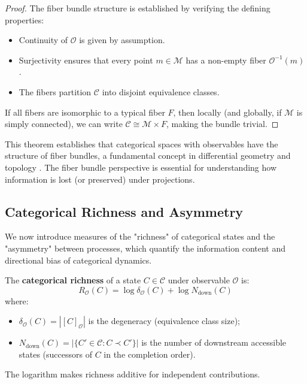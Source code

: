 \begin{proof}
The fiber bundle structure is established by verifying the defining properties:
\begin{itemize}
    \item Continuity of $\mathcal{O}$ is given by assumption.
    \item Surjectivity ensures that every point $m \in \mathcal{M}$ has a non-empty fiber $\mathcal{O}^{-1}(m)$.
    \item The fibers partition $\mathcal{C}$ into disjoint equivalence classes.
\end{itemize}

If all fibers are isomorphic to a typical fiber $F$, then locally (and globally, if $\mathcal{M}$ is simply connected), we can write $\mathcal{C} \cong \mathcal{M} \times F$, making the bundle trivial.
\end{proof}

This theorem establishes that categorical spaces with observables have the structure of fiber bundles, a fundamental concept in differential geometry and topology \citep{steenrod1951topology}. The fiber bundle perspective is essential for understanding how information is lost (or preserved) under projections.

\subsection{Categorical Richness and Asymmetry}

We now introduce measures of the "richness" of categorical states and the "asymmetry" between processes, which quantify the information content and directional bias of categorical dynamics.

\begin{definition}
\label{def:richness_formal}
The \textbf{categorical richness} of a state $C \in \mathcal{C}$ under observable $\mathcal{O}$ is:
\begin{equation}
R_{\mathcal{O}}(C) = \log \delta_{\mathcal{O}}(C) + \log N_{\text{down}}(C)
\label{eq:richness}
\end{equation}
where:
\begin{itemize}
    \item $\delta_{\mathcal{O}}(C) = |[C]_{\mathcal{O}}|$ is the degeneracy (equivalence class size);
    \item $N_{\text{down}}(C) = |\{C' \in \mathcal{C} : C \prec C'\}|$ is the number of downstream accessible states (successors of $C$ in the completion order).
\end{itemize}

The logarithm makes richness additive for independent contributions.
\end{definition}

